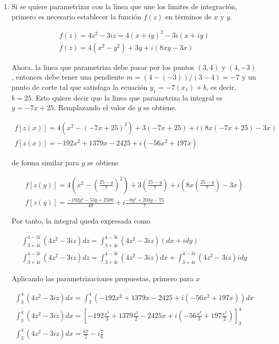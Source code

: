 \begin{enumerate}
    \item Si se quiere parametrizar con la linea que une los limites de integración, primero es necesario establecer la función $f(z)$ en términos de $x$ y $y$. 
    
    \begin{gather*}
        f(z) = 4z^2 - 3iz  = 4(x+iy)^2 - 3i(x+iy)\\
        f(z) = 4(x^2 - y^2) + 3y + i(8xy - 3x)
    \end{gather*}

    Ahora, la linea que parametriza debe pasar por los puntos $(3,4)$ y $(4,-3)$, entonces debe tener una pendiente $m = (4-(-3))/(3-4) = -7$ y un punto de corte tal que satisfaga la ecuación $y_1 = -7(x_1) + b$, es decir, $b = 25$. Esto quiere decir que la linea que parametriza la integral es $y = -7x + 25$. Remplazando el valor de $y$ se obtiene.

    \begin{gather*}
        f[z(x)] = 4(x^2 - (-7x + 25)^2) + 3( -7x + 25) + i(8x( -7x + 25) - 3x)\\
        f[z(x)] =  -192x^2 + 1379x - 2425 + i(-56x^2 + 197x)
    \end{gather*}

    de forma similar para $y$ se obtiene 

    \begin{gather*}
        f[z(y)] = 4\left(x^2 - \left(\frac{25-y}{7}\right)^2\right) + 3\left(\frac{25-y}{7}\right) + i\left(8x\left(\frac{25-y}{7}\right) - 3x\right)\\
        f[z(y)] = \frac{-192y^2 - 53y + 2500}{49} + i\frac{-8y^2 + 203y - 75}{7}
    \end{gather*}

    Por tanto, la integral queda expresada como 

    \begin{gather*}
        \int_{3+4i}^{4-3i}(4z^2 - 3iz)dz  = \int_{3+4i}^{4-3i}(4z^2 - 3iz)(dx + idy)\\
        \int_{3+4i}^{4-3i}(4z^2 - 3iz)dz  = \int_{3+4i}^{4-3i}(4z^2 - 3iz)dx + \int_{3+4i}^{4-3i}(4z^2 - 3iz)idy
    \end{gather*}

    Aplicando las parametrizaciones propuestas, primero para $x$

    \begin{gather*}
        \int_{3}^{4}(4z^2 - 3iz)dx  = \int_{3}^{4}(-192x^2 + 1379x - 2425 + i(-56x^2 + 197x))dx\\
        \int_{3}^{4}(4z^2 - 3iz)dx  = \left[-192\frac{x{^3}}{3} + 1379\frac{x{^2}}{2} - 2425x + i\left(-56\frac{x{^3}}{3} + 197\frac{x{^2}}{2}\right)\right]_3^{4}\\
        \int_{3}^{4}(4z^2 - 3iz)dx  = \frac{67}{2} - i\frac{7}{6}
    \end{gather*}



\end{enumerate}
